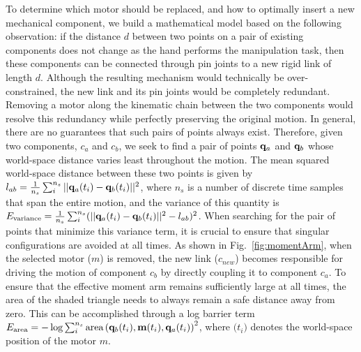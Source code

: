 To determine which motor should be replaced, and how to optimally insert a new mechanical component, we build a mathematical model based on the following observation: if the distance $d$ between two points on a pair of existing components does not change as the hand performs the manipulation task, then these components can be connected through pin joints to a new rigid link of length $d$. Although the resulting mechanism would technically be over-constrained, the new link and its pin joints would be completely redundant. Removing a motor along the kinematic chain between the two components would resolve this redundancy while perfectly preserving the original motion. In general, there are no guarantees that such pairs of points always exist. Therefore, given two components, $c_a$ and $c_b$, we seek to find a pair of points $\mathbf{q}_a$ and $\mathbf{q}_b$ whose world-space distance varies least throughout the motion. The mean squared world-space distance between these two points is given by $l_{ab}=\frac{1}{n_s}\sum_i^{n_s}||\mathbf{q}_a(t_i)-\mathbf{q}_b(t_i)||^2$, where $n_s$ is a number of discrete time samples that span the entire motion, and the variance of this quantity is $ E_\mathrm{variance}=\frac{1}{n_s}\sum_i^{n_s}(||\mathbf{q}_a(t_i)-\mathbf{q}_b(t_i)||^2-l_{ab})^2$. When searching for the pair of points that minimize this variance term, it is crucial to ensure that singular configurations are avoided at all times. As shown in Fig.~\ref{fig:momentArm}, when the selected motor ($m$) is removed, the new link ($c_{new}$) becomes responsible for driving the motion of component $c_b$ by directly coupling it to component $c_a$. To ensure that the effective moment arm remains sufficiently large at all times, the area of the shaded triangle needs to always remain a safe distance away from zero. This can be accomplished through a log barrier term $E_\mathrm{area} = -\log\sum_i^{n_s}\text{area}\left(\mathbf{q}_b(t_i),\mathbf{m}(t_i),\mathbf{q}_a(t_i)\right)^2$, where $\bm(t_i)$ denotes the world-space position of the motor $m$.


